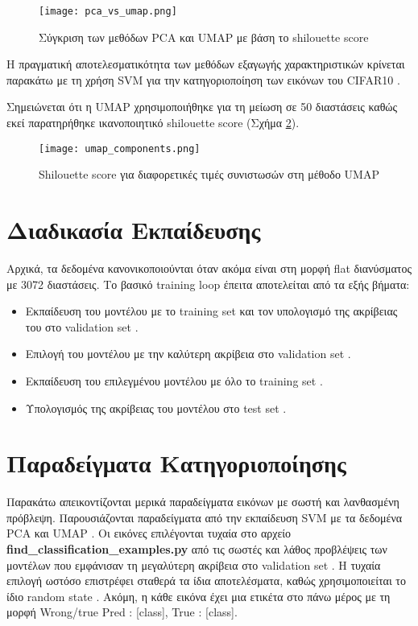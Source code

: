 \documentclass[a4paper,12pt]{article}
\newcommand{\lt}{\latintext}
\newcommand{\gt}{\greektext}
\begin{document}
\begin{figure}[H]
    \centering
    \texttt{[image: pca\_vs\_umap.png]}
    \caption{Σύγκριση των μεθόδων \lt PCA \gt και \lt UMAP \gt με βάση το \lt shilouette score \gt}
    \label{fig:versus}
\end{figure}

Η πραγματική αποτελεσματικότητα των μεθόδων εξαγωγής χαρακτηριστικών κρίνεται παρακάτω με τη χρήση \lt SVM \gt για 
την κατηγοριοποίηση των εικόνων του \lt CIFAR10 \gt.

Σημειώνεται ότι η \lt UMAP \gt χρησιμοποιήθηκε για τη μείωση σε 50 διαστάσεις καθώς εκεί παρατηρήθηκε ικανοποιητικό \lt shilouette score \gt (Σχήμα \ref{fig:umap_comp}).

\begin{figure}[H]
    \centering
    \texttt{[image: umap\_components.png]}
    \caption{\lt Shilouette score \gt για διαφορετικές τιμές συνιστωσών στη μέθοδο \lt UMAP \gt}
    \label{fig:umap_comp}
\end{figure}


\section{Διαδικασία Εκπαίδευσης}
Αρχικά, τα δεδομένα κανονικοποιούνται όταν ακόμα είναι στη μορφή \lt flat \gt διανύσματος με 3072 διαστάσεις. 
Το βασικό \lt training loop \gt έπειτα αποτελείται από τα εξής βήματα:
\begin{itemize}
    \item Εκπαίδευση του μοντέλου με το \lt training set \gt και τον υπολογισμό της ακρίβειας του στο \lt validation set \gt.
    \item Επιλογή του μοντέλου με την καλύτερη ακρίβεια στο \lt validation set \gt.
    \item Εκπαίδευση του επιλεγμένου μοντέλου με όλο το \lt training set \gt.
    \item Υπολογισμός της ακρίβειας του μοντέλου στο \lt test set \gt.
\end{itemize}




\section{Παραδείγματα Κατηγοριοποίησης}
Παρακάτω απεικοντίζονται μερικά παραδείγματα εικόνων με σωστή και λανθασμένη πρόβλεψη.  
Παρουσιάζονται παραδείγματα από την εκπαίδευση \lt SVM \gt με τα δεδομένα \lt PCA \gt και \lt UMAP \gt.
Οι εικόνες επιλέγονται τυχαία στο αρχείο 
\lt \textbf{find\_classification\_examples.py} \gt
από τις σωστές και λάθος προβλέψεις των μοντέλων που εμφάνισαν τη μεγαλύτερη ακρίβεια στο \lt validation set \gt
. Η τυχαία επιλογή ωστόσο επιστρέφει σταθερά 
τα ίδια αποτελέσματα, καθώς χρησιμοποιείται το ίδιο \lt random state \gt . Ακόμη, η κάθε εικόνα
έχει μια ετικέτα στο πάνω μέρος με τη μορφή \lt Wrong/true Pred : [class], True : [class]\gt.
\end{document}
